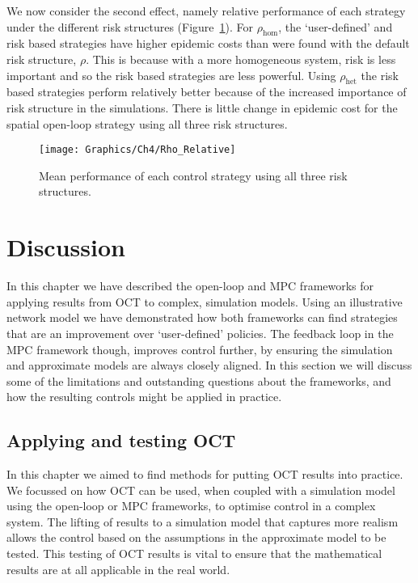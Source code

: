 We now consider the second effect, namely relative performance of each strategy under the different risk structures (Figure~\ref{fig:ch4:rho_relative}). For $\rho_{\mathrm{hom}}$, the `user-defined' and risk based strategies have higher epidemic costs than were found with the default risk structure, $\rho$. This is because with a more homogeneous system, risk is less important and so the risk based strategies are less powerful. Using $\rho_{\mathrm{het}}$ the risk based strategies perform relatively better because of the increased importance of risk structure in the simulations. There is little change in epidemic cost for the spatial open-loop strategy using all three risk structures.

\begin{figure}
    \begin{center}
        \texttt{[image: Graphics/Ch4/Rho\_Relative]}
        \caption[Comparing control performance across risk structures]{Mean performance of each control strategy using all three risk structures.}
        \label{fig:ch4:rho_relative}
    \end{center}
\end{figure}

\FloatBarrier

\section{Discussion}\label{sec:ch4:Discussion}

In this chapter we have described the open-loop and MPC frameworks for applying results from OCT to complex, simulation models. Using an illustrative network model we have demonstrated how both frameworks can find strategies that are an improvement over `user-defined' policies. The feedback loop in the MPC framework though, improves control further, by ensuring the simulation and approximate models are always closely aligned. In this section we will discuss some of the limitations and outstanding questions about the frameworks, and how the resulting controls might be applied in practice.

\subsection{Applying and testing OCT}

In this chapter we aimed to find methods for putting OCT results into practice. We focussed on how OCT can be used, when coupled with a simulation model using the open-loop or MPC frameworks, to optimise control in a complex system. The lifting of results to a simulation model that captures more realism allows the control based on the assumptions in the approximate model to be tested. This testing of OCT results is vital to ensure that the mathematical results are at all applicable in the real world.

